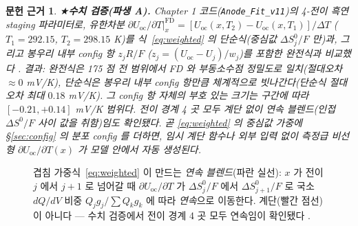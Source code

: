 \documentclass[11pt,a4paper]{article}
\newtheorem*{srcbox}{문헌 근거}
\newcommand{\oc}{\mathrm{oc}}
\begin{document}
\begin{srcbox}
★\textbf{수치 검증(파생 A).} Chapter 1 코드(\texttt{Anode\_Fit\_v11})의 4-전이 흑연 staging 파라미터로,
유한차분 $\partial U_\oc/\partial T|_x^\mathrm{FD}=[U_\oc(x,T_2)-U_\oc(x,T_1)]/\Delta T$ ($T_1{=}292.15$,
$T_2{=}298.15$ K)를 식~\eqref{eq:weighted} 의 \emph{단순식}(중심값 $\Delta S^0_j/F$ 만)과, 그리고 봉우리 내부
config 항 $z_j R/F$ ($z_j=(U_\oc-U_j)/w_j$)를 포함한 \emph{완전식}과 비교했다 \cite{numverif2026}. 결과:
완전식은 175 점 전 범위에서 FD 와 \emph{부동소수점 정밀도}로 일치(절대오차 $\approx0$ mV/K), 단순식은 봉우리
내부 config 항만큼 체계적으로 빗나간다(단순식 절대오차 최대 $0.18$ mV/K). 그 config 항 자체의 부호 있는 크기는
구간에 따라 $[-0.21,+0.14]$ mV/K 범위다. 전이 경계 4 곳 모두 \emph{계단 없이} 연속 블렌드(인접 $\Delta S^0/F$
사이 값을 취함)임도 확인됐다. 곧 \eqref{eq:weighted} 의 중심값 가중에 \S\ref{sec:config} 의
분포 config 를 더하면, 임시 계단 함수나 외부 입력 없이 \emph{측정급 비선형} $\partial U_\oc/\partial T(x)$ 가
모델 안에서 자동 생성된다.
\end{srcbox}

\begin{figure}[t]
\centering
{}
\caption{겹침 가중식~\eqref{eq:weighted} 이 만드는 \emph{연속 블렌드}(파란 실선): $x$ 가 전이 $j$ 에서 $j{+}1$ 로 넘어갈 때 $\partial U_\oc/\partial T$ 가 $\Delta S^0_j/F$ 에서 $\Delta S^0_{j+1}/F$ 로 국소 $dQ/dV$ 비중 $Q_jg_j/\sum Q_kg_k$ 에 따라 \emph{연속}으로 이동한다. 계단(빨간 점선)이 아니다 — 수치 검증에서 전이 경계 4 곳 모두 연속임이 확인됐다 \cite{numverif2026}.}
\label{fig:blend}
\end{figure}
\end{document}
